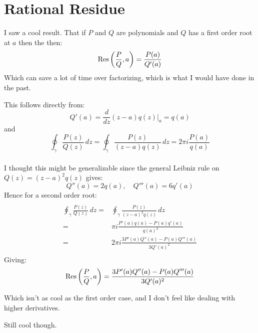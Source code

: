 
\section{Rational Residue}
I saw a cool result.
That if $P$ and $Q$ are polynomials and $Q$ has a first order root at $a$ then the then:
\[\operatorname{Res}\left(\frac{P}{Q},a\right) = \frac{P(a)}{Q'(a)} \]
Which can save a lot of time over factorizing, 
which is what I would have done in the past.

This follows directly from:
\[Q'(a)=\frac{d}{dz}(z-a)q(z)\bigg|_a = q(a)\]
and
\[\oint_\gamma\frac{P(z)}{Q(z)}\,dz = \oint_\gamma \frac{P(z)}{(z-a)q(z)}\,dz = 2\pi i\frac{P(a)}{q(a)}\]
\\

I thought this might be generalizable since the general Leibniz rule on $Q(z)=(z-a)^2q(z)$ gives:
\[Q''(a)=2q(a),\quad Q'''(a)=6q'(a)\]
Hence for a second order root:
\begin{equation*}
\begin{aligned}
\end{aligned}
\end{equation*}
\begin{equation*}
\begin{aligned}
	\oint_\gamma\frac{P(z)}{Q(z)}\,dz =& \oint_\gamma \frac{P(z)}{(z-a)^2q(z)}\,dz \\
	=& \pi i\frac{P'(a)q(a)-P(a)q'(a)}{q(a)^2}\\
	=& 2\pi i\frac{3P'(a)Q''(a)-P(a)Q'''(a)}{3Q'(a)^2}\\
\end{aligned}
\end{equation*}
Giving:
\[\operatorname{Res}\left(\frac{P}{Q},a\right)= \frac{3P'(a)Q''(a)-P(a)Q'''(a)}{3Q'(a)^2} \]

Which isn't as cool as the first order case,
and I don't feel like dealing with higher derivatives.

Still cool though.

